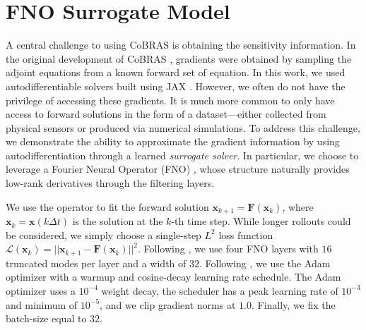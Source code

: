 \documentclass[twocolumn,10pt]{article}
\begin{document}
\section{FNO Surrogate Model}
\label{si:fno}
A central challenge to using CoBRAS is obtaining the sensitivity information. In the original development of CoBRAS \cite{otto2023model}, gradients were obtained by sampling the adjoint equations from a known forward set of equation. In this work, we used autodifferentiable solvers built using JAX \cite{jax2018github}. However, we often do not have the privilege of accessing these gradients. It is much more common to only have access to forward solutions in the form of a dataset---either collected from physical sensors or produced via numerical simulations. To address this challenge, we demonstrate the ability to approximate the gradient information by using autodifferentiation through a learned \textit{surrogate solver}. In particular, we choose to leverage a Fourier Neural Operator (FNO) \cite{li2021fourier}, whose structure naturally provides low-rank derivatives through the filtering layers. 

We use the operator to fit the forward solution $\mathbf x_{k + 1} = \mathbf F(\mathbf x_k)$, where $\mathbf{x}_{k} = \mathbf{x}(k\Delta t)$ is the solution at the $k$-th time step. While longer rollouts could be considered, we simply choose a single-step $L^2$ loss function $\mathcal L(\mathbf x_k) =||\mathbf{x}_{k+1} - \mathbf F(\mathbf{x}_k)||^2$. Following \cite{li2021fourier}, we use four FNO layers with $16$ truncated modes per layer and a width of $32$. Following \cite{guibas2021adaptive}, we use the Adam optimizer with a warmup and cosine-decay learning rate schedule. The Adam optimizer uses a $10^{-4}$ weight decay,  the scheduler has a peak learning rate of $10^{-3}$ and minimum of $10^{-5}$, and we clip gradient norms at $1.0$. Finally, we fix the batch-size equal to $32$. 
\end{document}
